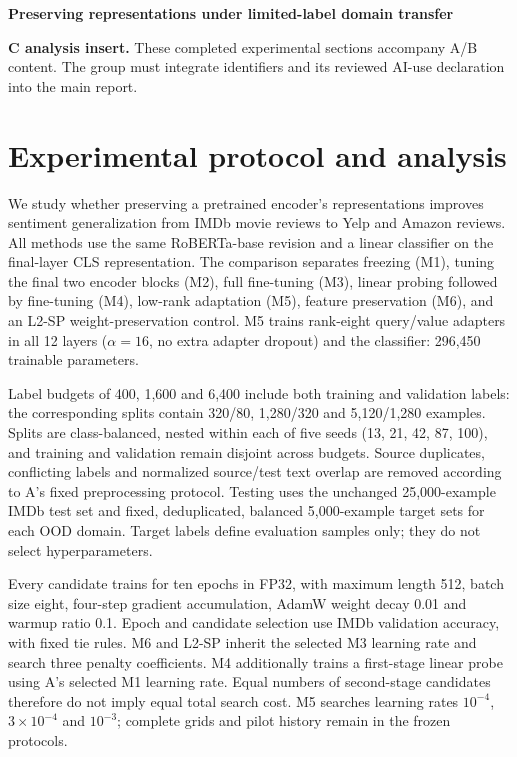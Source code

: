 \documentclass[a4paper,10pt]{article}
\begin{document}
{\Large\bfseries Preserving representations under limited-label domain transfer}\par
\textbf{C analysis insert.} These completed experimental sections accompany A/B content. The group must integrate identifiers and its reviewed AI-use declaration into the main report.

\section{Experimental protocol and analysis}
We study whether preserving a pretrained encoder's representations improves sentiment generalization from IMDb movie reviews to Yelp and Amazon reviews. All methods use the same RoBERTa-base revision and a linear classifier on the final-layer CLS representation. The comparison separates freezing (M1), tuning the final two encoder blocks (M2), full fine-tuning (M3), linear probing followed by fine-tuning (M4), low-rank adaptation (M5), feature preservation (M6), and an L2-SP weight-preservation control. M5 trains rank-eight query/value adapters in all 12 layers ($\alpha=16$, no extra adapter dropout) and the classifier: 296,450 trainable parameters. 

Label budgets of 400, 1,600 and 6,400 include both training and validation labels: the corresponding splits contain 320/80, 1,280/320 and 5,120/1,280 examples. Splits are class-balanced, nested within each of five seeds (13, 21, 42, 87, 100), and training and validation remain disjoint across budgets. Source duplicates, conflicting labels and normalized source/test text overlap are removed according to A's fixed preprocessing protocol. Testing uses the unchanged 25,000-example IMDb test set and fixed, deduplicated, balanced 5,000-example target sets for each OOD domain. Target labels define evaluation samples only; they do not select hyperparameters.

Every candidate trains for ten epochs in FP32, with maximum length 512, batch size eight, four-step gradient accumulation, AdamW weight decay 0.01 and warmup ratio 0.1. Epoch and candidate selection use IMDb validation accuracy, with fixed tie rules. M6 and L2-SP inherit the selected M3 learning rate and search three penalty coefficients. M4 additionally trains a first-stage linear probe using A's selected M1 learning rate. Equal numbers of second-stage candidates therefore do not imply equal total search cost. M5 searches learning rates $10^{-4}$, $3\times10^{-4}$ and $10^{-3}$; complete grids and pilot history remain in the frozen protocols.
\end{document}
